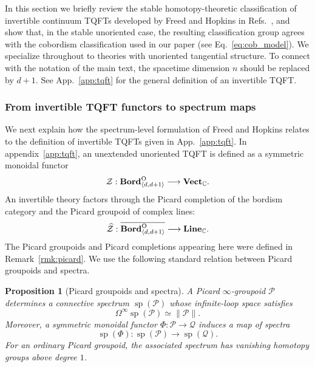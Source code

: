 \documentclass[aps,prx,reprint,superscriptaddress,twocolumn,amsmath,amssymb,amsfonts, nofootinbib]{revtex4-2}
\newcommand{\bordd}{{\bf Bord}_{\langle d, d+1\rangle}}
\newcommand{\vect}{{\bf Vect}_{\mathbb{C}}}
\newcommand{\Line}{{\bf Line}_{\mathbb{C}}}
\theoremstyle{apsstyle}
\newtheorem{proposition}[theorem]{Proposition}
\begin{document}
In this section we briefly review the stable homotopy-theoretic classification of invertible continuum TQFTs developed by Freed and Hopkins in Refs.~\cite{Freed2014,FreedHopkins}, and show that, in the stable unoriented case, the resulting classification group agrees with the cobordism classification used in our paper (see Eq.~\ref{eq:cob_model}). We specialize throughout to theories with unoriented tangential structure. To connect with the notation of the main text, the spacetime dimension $n$ should be replaced by $d+1$. See App.~\ref{app:tqft} for the general definition of an invertible TQFT.

\subsubsection{From invertible TQFT functors to spectrum maps}
\label{sec:cob_functors_to_spectra}



We next explain how the spectrum-level formulation of Freed and Hopkins relates to the definition of invertible TQFTs given in App.~\ref{app:tqft}. In appendix~\ref{app:tqft}, an unextended unoriented TQFT is defined as a symmetric monoidal functor
\begin{equation*}
    \mathcal Z:
    \bordd^{\mathrm O}
    \longrightarrow
    \vect.
\end{equation*}
An invertible theory factors through the Picard completion of the
bordism category and the Picard groupoid of complex lines:
\begin{equation}
    \widehat{\mathcal Z}:
    \overline{\bordd^{\mathrm O}}
    \longrightarrow
    \Line.
    \label{eq:unextended_invertible_TQFT}
\end{equation}
\noindent The Picard groupoids and Picard completions appearing here were defined in Remark~\ref{rmk:picard}. We use the following standard relation between Picard groupoids and spectra.


\bigskip 


\begin{proposition}[Picard groupoids and spectra]
\label{prop:Picard_groupoids_spectra}
A Picard $\infty$-groupoid $\mathcal P$ determines a connective
spectrum $\operatorname{sp}(\mathcal P)$ whose infinite-loop space
satisfies
\begin{equation*}
    \Omega^\infty\operatorname{sp}(\mathcal P)
    \simeq
    \lVert\mathcal P\rVert.
\end{equation*}
Moreover, a symmetric monoidal functor
$\Phi:\mathcal P\to\mathcal Q$ induces a map of spectra
\begin{equation*}
    \operatorname{sp}(\Phi):
    \operatorname{sp}(\mathcal P)
    \longrightarrow
    \operatorname{sp}(\mathcal Q).
\end{equation*}
For an ordinary Picard groupoid, the associated spectrum has vanishing
homotopy groups above degree $1$.
\end{proposition}
\end{document}
